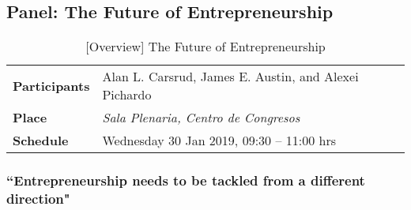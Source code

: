 \documentclass[11pt,a4paper]{article}
\begin{document}
\subsection{Panel: The Future of Entrepreneurship}\label{sec:panel1}

\parencite{Carsrud2019}
\begin{table}[h] %
\centering
\begin{tabular}{|l|l|}
\hline
\textbf{Participants} &  Alan L. Carsrud, James E. Austin, and Alexei Pichardo \\
\textbf{Place}        & \emph{Sala Plenaria, Centro de Congresos} \\
\textbf{Schedule}     & Wednesday 30 Jan 2019, 09:30 – 11:00 hrs \\
\hline
\end{tabular}
\caption{[Overview] The Future of Entrepreneurship}\label{tab:table}
\end{table}

\subsubsection*{``Entrepreneurship needs to be tackled from a different direction"}







\end{document}

